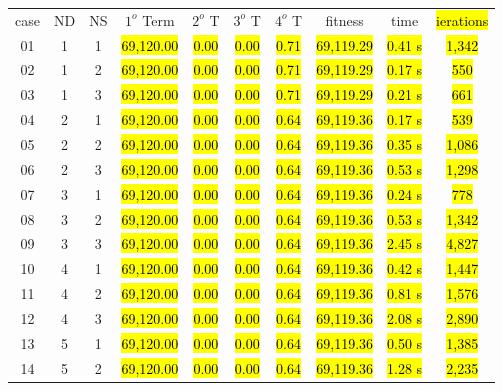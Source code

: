\documentclass{singlecol}
\theoremstyle{TH}{
\newtheorem{lemma}{Lemma}
\newtheorem{theorem}[lemma]{Theorem}
\newtheorem{corrolary}[lemma]{Corrolary}
\newtheorem{conjecture}[lemma]{Conjecture}
\newtheorem{proposition}[lemma]{Proposition}
\newtheorem{claim}[lemma]{Claim}
\newtheorem{stheorem}[lemma]{Wrong Theorem}
\newtheorem{algorithm}{Algorithm}
}
\theoremstyle{THrm}{
\newtheorem{definition}{Definition}[section]
\newtheorem{question}{Question}[section]
\newtheorem{remark}{Remark}
\newtheorem{scheme}{Scheme}
}
\theoremstyle{THhit}{
\newtheorem{case}{Case}[section]
}
\begin{document}
\begin{table}[h!]
\begin{center}
\begin{small}
	\begin{tabular}{ c c c c c c c c c c }     
	case & ND & NS &  $1^o$ Term & $2^o$ T & $3^o$ T & $4^o$ T &  fitness  &  time  & \hl{ierations}     \\
	 01  &  1 & 1  &  \hl{69,120.00}  &  \hl{0.00}  & \hl{0.00} &  \hl{0.71}   &   \hl{69,119.29}  & \hl{0.41 s} & \hl{1,342}     \\
	 02  &  1 & 2  &  \hl{69,120.00}  &  \hl{0.00}  & \hl{0.00} &  \hl{0.71}   &   \hl{69,119.29}  & \hl{0.17 s} & \hl{550}     \\
	 03  &  1 & 3  &  \hl{69,120.00}  &  \hl{0.00}  & \hl{0.00} &  \hl{0.71}   &   \hl{69,119.29}  & \hl{0.21 s} & \hl{661}     \\
	 04  &  2 & 1  & \hl{69,120.00}  &  \hl{0.00}  & \hl{0.00} &  \hl{0.64}   &   \hl{69,119.36}  & \hl{0.17 s} & \hl{539}     \\
	 05  &  2 & 2  & \hl{69,120.00}  &  \hl{0.00}  & \hl{0.00} &  \hl{0.64}   &   \hl{69,119.36}  & \hl{0.35 s} & \hl{1,086}     \\
	 06  &  2 & 3  & \hl{69,120.00}  &  \hl{0.00}  & \hl{0.00} &  \hl{0.64}   &   \hl{69,119.36}  & \hl{0.53 s} & \hl{1,298}     \\
	 07  &  3 & 1  & \hl{69,120.00}  &  \hl{0.00}  & \hl{0.00} &  \hl{0.64}   &   \hl{69,119.36}  & \hl{0.24 s} & \hl{778}     \\
	 08  &  3 & 2  & \hl{69,120.00}  &  \hl{0.00}  & \hl{0.00} &  \hl{0.64}   &   \hl{69,119.36}  & \hl{0.53 s} & \hl{1,342}     \\
	 09  &  3 & 3  & \hl{69,120.00}  &  \hl{0.00}  & \hl{0.00} &  \hl{0.64}   &   \hl{69,119.36}  & \hl{2.45 s} & \hl{4,827}     \\
	 10  &  4 & 1  & \hl{69,120.00}  &  \hl{0.00}  & \hl{0.00} &  \hl{0.64}   &   \hl{69,119.36}  & \hl{0.42 s} & \hl{1,447}     \\
	 11  &  4 & 2  & \hl{69,120.00}  &  \hl{0.00}  & \hl{0.00} &  \hl{0.64}   &   \hl{69,119.36}  & \hl{0.81 s} & \hl{1,576}     \\
	 12  &  4 & 3  & \hl{69,120.00}  &  \hl{0.00}  & \hl{0.00} &  \hl{0.64}   &   \hl{69,119.36}  & \hl{2.08 s} & \hl{2,890}     \\
	 13  &  5 & 1  & \hl{69,120.00}  &  \hl{0.00}  & \hl{0.00} &  \hl{0.64}   &   \hl{69,119.36}  & \hl{0.50 s} & \hl{1,385}     \\
	 14  &  5 & 2  & \hl{69,120.00}  &  \hl{0.00}  & \hl{0.00} &  \hl{0.64}   &   \hl{69,119.36}  & \hl{1.28 s} & \hl{2,235}     \\

\end{tabular}
\end{small}
\end{center}
\end{table}
\end{document}
